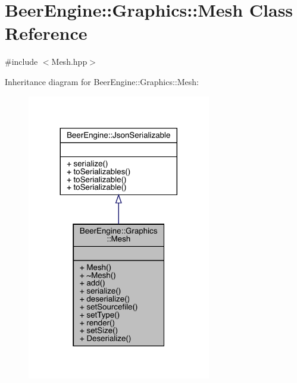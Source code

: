 \hypertarget{class_beer_engine_1_1_graphics_1_1_mesh}{}\section{Beer\+Engine\+:\+:Graphics\+:\+:Mesh Class Reference}
\label{class_beer_engine_1_1_graphics_1_1_mesh}


{\ttfamily \#include $<$Mesh.\+hpp$>$}



Inheritance diagram for Beer\+Engine\+:\+:Graphics\+:\+:Mesh\+:\nopagebreak
\begin{figure}[H]
\begin{center}
\leavevmode
\includegraphics[width=227pt]{class_beer_engine_1_1_graphics_1_1_mesh__inherit__graph}
\end{center}
\end{figure}



